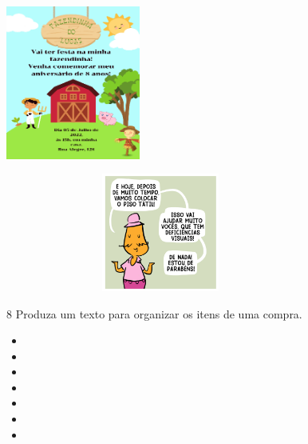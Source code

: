 \includegraphics[width=1.73819in,height=1.98472in]{media/image109.png}

\includegraphics[width=4.02222in,height=1.52917in]{media/image110.png}


\num{8} Produza um texto para organizar os itens de uma compra.


\begin{itemize}
\item \reduline{\mbox{}\hfill}

\item \reduline{\mbox{}\hfill}

\item \reduline{\mbox{}\hfill}

\item \reduline{\mbox{}\hfill}

\item \reduline{\mbox{}\hfill}

\item \reduline{\mbox{}\hfill}

\item \reduline{\mbox{}\hfill}
\end{itemize}


